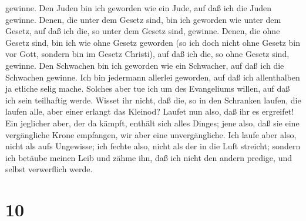 gewinne.  Den Juden bin ich geworden wie ein Jude, auf daß
ich die Juden gewinne. Denen, die unter dem Gesetz sind, bin ich
geworden wie unter dem Gesetz, auf daß ich die, so unter dem Gesetz
sind, gewinne.  Denen, die ohne Gesetz sind, bin ich wie
ohne Gesetz geworden (so ich doch nicht ohne Gesetz bin vor Gott,
sondern bin im Gesetz Christi), auf daß ich die, so ohne Gesetz sind,
gewinne.  Den Schwachen bin ich geworden wie ein Schwacher,
auf daß ich die Schwachen gewinne. Ich bin jedermann allerlei geworden,
auf daß ich allenthalben ja etliche selig mache.  Solches
aber tue ich um des Evangeliums willen, auf daß ich sein teilhaftig
werde.  Wisset ihr nicht, daß die, so in den Schranken
laufen, die laufen alle, aber einer erlangt das Kleinod? Laufet nun
also, daß ihr es ergreifet!  Ein jeglicher aber, der da
kämpft, enthält sich alles Dinges; jene also, daß sie eine vergängliche
Krone empfangen, wir aber eine unvergängliche.  Ich laufe
aber also, nicht als aufs Ungewisse; ich fechte also, nicht als der in
die Luft streicht;  sondern ich betäube meinen Leib und
zähme ihn, daß ich nicht den andern predige, und selbst verwerflich
werde.

\hypertarget{section-9}{%
\section{10}\label{section-9}}

